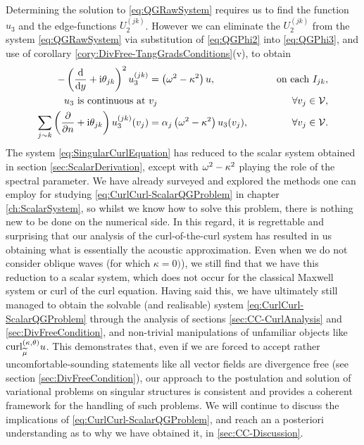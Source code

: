 Determining the solution to \eqref{eq:QGRawSystem} requires us to find the function $u_3$ and the edge-functions $U_2^{(jk)}$.
However we can eliminate the $U_2^{(jk)}$ from the system \eqref{eq:QGRawSystem} via substitution of \eqref{eq:QGPhi2} into \eqref{eq:QGPhi3}, and use of corollary \ref{cory:DivFree-TangGradsConditions}(v), to obtain
\begin{subequations} \label{eq:CurlCurl-ScalarQGProblem}
	\begin{align}
		-\left(  \dfrac{\mathrm{d}}{\mathrm{d}y} + \mathrm{i}\theta_{jk}  \right)^2 u_3^{(jk)} &= \left( \omega^2-\kappa^2 \right)u,
		\qquad &\text{on each } I_{jk}, \\
		u_3 \text{ is continuous at } & v_j \qquad &\forall v_j\in\mathcal{V}, \\
		\sum_{j\sim k}\left( \dfrac{\partial }{\partial n}+\mathrm{i}\theta_{jk} \right)u_3^{(jk)}(v_j) &= \alpha_j\left( \omega^2-\kappa^2 \right)u_3(v_j), \qquad &\forall v_j\in\mathcal{V}.
	\end{align}
\end{subequations}
The system \eqref{eq:SingularCurlEquation} has reduced to the scalar system obtained in section \ref{sec:ScalarDerivation}, except with $\omega^2-\kappa^2$ playing the role of the spectral parameter.
We have already surveyed and explored the methods one can employ for studying \eqref{eq:CurlCurl-ScalarQGProblem} in chapter \ref{ch:ScalarSystem}, so whilst we know how to solve this problem, there is nothing new to be done on the numerical side.
In this regard, it is regrettable and surprising that our analysis of the curl-of-the-curl system has resulted in us obtaining what is essentially the acoustic approximation.
Even when we do not consider oblique waves (for which $\kappa=0)$), we still find that we have this reduction to a scalar system, which does not occur for the classical Maxwell system or curl of the curl equation.
Having said this, we have ultimately still managed to obtain the solvable (and realisable) system \eqref{eq:CurlCurl-ScalarQGProblem} through the analysis of sections \ref{sec:CC-CurlAnalysis} and \ref{sec:DivFreeCondition}, and non-trivial manipulations of unfamiliar objects like $\mathrm{curl}_{\widetilde{\mu}}^{\left( \kappa, \theta \right)}u$.
This demonstrates that, even if we are forced to accept rather uncomfortable-sounding statements like all vector fields are divergence free (see section \ref{sec:DivFreeCondition}), our approach to the postulation and solution of variational problems on singular structures is consistent and provides a coherent framework for the handling of such problems.
We will continue to discuss the implications of \eqref{eq:CurlCurl-ScalarQGProblem}, and reach an a posteriori understanding as to why we have obtained it, in \ref{sec:CC-Discussion}.